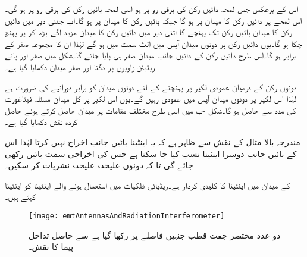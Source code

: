اس کے برعکس جس لمحہ دائیں رکن کی برقی رو   پر ہو اسی لمحہ بائیں رکن کی برقی رو  پر ہو گی۔اس لمحے پر دائیں رکن کا میدان  پر ہو گا جبکہ بائیں رکن کا میدان  پر ہو گا۔اب جتنی دیر میں دائیں رکن کا میدان بائیں رکن تک پہنچے گا اتنی دیر میں دائیں رکن کا میدان مزید  آگے بڑھ کر  پر پہنچ چکا ہو گا۔یوں دائیں رکن  پر دونوں میدان آپس میں الٹ سمت میں ہو گے لہٰذا ان کا مجموعہ صفر کے برابر ہو گا۔اس طرح دائیں رکن کے دائیں جانب میدان صفر ہی پایا جائے گا۔شکل  میں صفر اور پائے ریڈیئن زاویوں  پر دگنا اور صفر میدان دکھایا گیا ہے۔ 

دونوں رکن کے درمیان عمودی لکیر پر پہنچنے کے لئے دونوں میدان کو برابر دورانیے کی ضرورت ہے لہٰذا اس لکیر پر دونوں میدان آپس میں عمودی رہیں گے۔یوں اس لکیر پر کل میدان مسئلہ فیثاغورث کی مدد سے  حاصل ہو گا۔شکل -ب میں اسی طرح مختلف مقامات پر میدان حاصل کرتے ہوئے حاصل کردہ نقش دکھایا گیا ہے۔

مندرجہ بالا مثال کے نقش سے ظاہر ہے کہ یہ اینٹینا بائیں جانب اخراج نہیں کرتا لہٰذا اس کے بائیں جانب دوسرا اینٹینا نسب کیا جا سکتا ہے جس کی اخراجی سمت بائیں رکھی جائے گی تا کہ دونوں علیحدہ علیحدہ نشریات کر سکیں۔  

 کے میدان میں اینٹینا کا کلیدی کردار ہے۔ریڈیائی فلکیات میں استعمال ہونے والے اینٹینا کو  اینٹینا کہتے ہیں۔
\begin{figure}
\centering
\texttt{[image: emtAntennasAndRadiationInterferometer]}
\caption{دو عدد مختصر جفت قطب جنہیں  فاصلے پر رکھا گیا ہے سے حاصل تداخل پیما کا نقش۔}
\label{شکل_اینٹینا_تداخل_پیما}
\end{figure}

